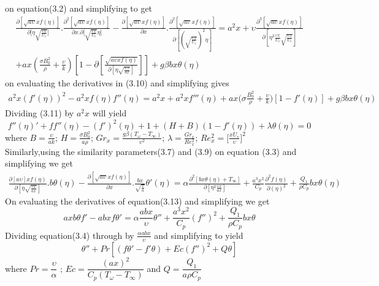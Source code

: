 \documentclass[a4paper,12pt]{report}
\begin{document}
{on equation(3.2) and simplifying to get
\begin{equation}
	\begin{split}
\frac{\partial[\sqrt{a\upsilon}xf(\eta)]}{\partial\big[\eta\sqrt{\frac{\upsilon x}{U_e}}]}.\frac{\partial^2[\sqrt{a\upsilon}xf(\eta)]}{\partial x . \partial\big[\sqrt{\frac{\upsilon x}{U_e}}\eta]} - \frac{\partial[\sqrt{a\upsilon}xf(\eta)]}{\partial x} . \frac{\partial^2[\sqrt{a\upsilon}x f(\eta)]}{\partial[(\sqrt{\frac{\upsilon x}{U_e}})^2\eta]} = a^2x + \upsilon\frac{\partial^3[\sqrt{a\upsilon}xf(\eta)]}{\partial[\eta^3\frac{\upsilon x}{U_e}\sqrt{\frac{\upsilon x}{U_e}}]}\\ + ax(\frac{\sigma B_0^2}{\rho}+\frac{\upsilon}{k})[1 - \partial[\frac{\sqrt{a\upsilon xf(\eta)}}{\partial[\eta\sqrt{\frac{\upsilon x}{ax}}]}]] + g\beta bx\theta(\eta)
\end{split}
\end{equation}
on evaluating the derivatives in (3.10) and simplifying gives
\begin{equation}
\begin{split}
a^2x(f'(\eta))^2 - a^2x f(\eta)f''(\eta) = a^2x + a^2x f'''(\eta) + ax\big(\sigma\frac{B_0^2}{\rho} + \frac{\upsilon}{k})[1 - f'(\eta)] +g\beta bx \theta(\eta)
\end{split}
\end{equation} 
Dividing (3.11) by $a^2x$ will yield
\begin{equation}
	f''(\eta)' + ff''(\eta) - (f')^2(\eta) + 1 + (H + B)(1 - f'(\eta)) + \lambda \theta(\eta) = 0
\end{equation}
where $B = \frac{\upsilon}{ak}$; $H = \frac{\sigma B_0^2}{a\rho}$; 	 $Gr_x = \frac{g\beta(T_\omega - T_\infty)}{\upsilon^2}$; $\lambda = \frac{Gr_x}{Re_x^2}$; $Re_x^2 = \big[\frac{xU_e}{\upsilon}]^2 $\\
Similarly,using the similarity parameters(3.7) and (3.9) on equation (3.3) and simplifying we get
 \begin{equation}
 \begin{split}
 \frac{\partial[a\upsilon]x f(\eta)}{\partial[\eta \sqrt{\frac{\upsilon x}{ax}}]}.b\theta(\eta) - \frac{\partial[\sqrt{a\upsilon}x f(\eta)]}{\partial x}.\frac{bx}{\sqrt{\frac{\upsilon}{a}}}\theta'(\eta) = \alpha\frac{\partial^2[bx\theta(\eta) + T_\infty]}{\partial[\eta^2\frac{\upsilon x}{ax}]} + \frac{a^3 x^2}{C_p}\frac{\partial^2 f(\eta)}{\partial (\eta)^2} + \frac{Q_1}{\rho C_p}bx\theta(\eta)
 \end{split}
 \end{equation}
 On evaluating the derivatives of equation(3.13) and simplifying we get
\begin{equation}
	axb\theta f' - abxf\theta' = \alpha\frac{abx}{\upsilon}\theta'' + \frac{a^3x^2}{C_p}(f'')^2 + \frac{Q_1}{\rho C_p}bx\theta
\end{equation}
Dividing equation(3.4) through by $\frac{\alpha abx}{\upsilon}$ and simplifying to yield
\begin{equation}
\theta'' + Pr[(f\theta' - f'\theta) + Ec (f'')^2 + Q\theta]
\end{equation} 
where $Pr=\dfrac{\upsilon}{\alpha}$ ; $Ec=\dfrac{(ax)^2}{C_p(T_\omega - T_\infty)}$ and $Q=\dfrac{Q_1}{a\rho C_p}$

}
\end{document}
